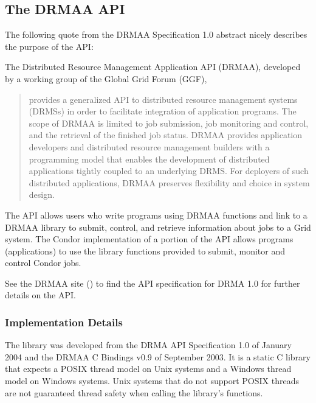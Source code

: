 \subsection{\label{API-DRMAA} The DRMAA API}

The following quote from the DRMAA Specification 1.0 abstract
nicely describes the purpose of the API:

The Distributed Resource Management Application API (DRMAA),
developed by a working group of the Global Grid Forum (GGF),
\begin{quote}
provides a generalized API to distributed resource management systems
(DRMSs) in order to facilitate integration of application programs.
The scope of DRMAA is limited to job submission,
job monitoring and control,
and the retrieval of the finished job status.
DRMAA provides application developers and
distributed resource management builders
with a programming model that enables
the development of distributed applications
tightly coupled to an underlying DRMS.
For deployers of such distributed applications,
DRMAA preserves flexibility and choice in system design.
\end{quote}

The API allows users who write programs using DRMAA functions
and link to a DRMAA library to submit,
control, and retrieve information about jobs to a Grid system.
The Condor implementation of a portion of the API
allows programs (applications) to use the library
functions provided to submit, monitor and control
Condor jobs.

See the DRMAA site 
() to find the
API specification for DRMA 1.0 for further details on the API.

\subsubsection{\label{DRMAA-Implementation} Implementation Details}


The library was developed from the DRMA API Specification 1.0 of January 2004
and the DRMAA C Bindings v0.9 of September 2003.
It is a static C library that expects a POSIX thread model
on Unix systems and a Windows thread model on Windows systems.
Unix systems that do not support POSIX threads
are not guaranteed thread safety when calling the library's functions.

